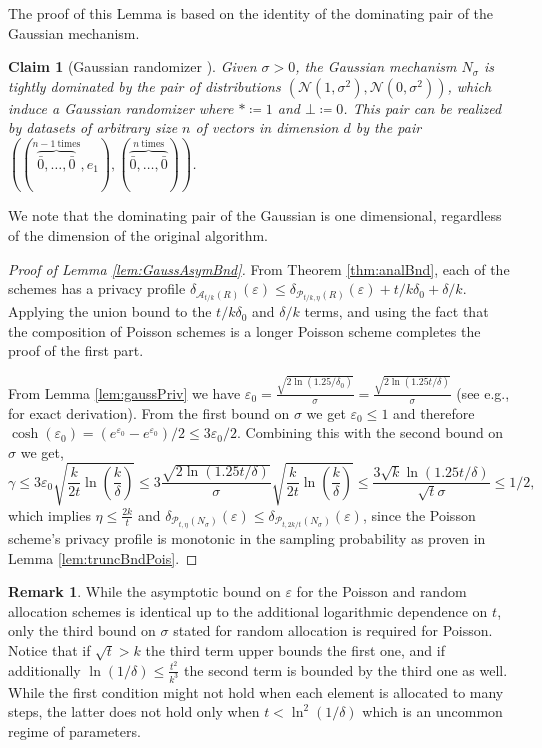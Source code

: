 \documentclass{article}
\newcommand{\mainThmAsym}{thm:analBnd}
\newcommand{\mainThmAsym}{thm:asymBnd}
\theoremstyle{plain}
\newtheorem{claim}[theorem]{Claim}
\theoremstyle{definition}
\newtheorem{remark}[theorem]{Remark}
\newcommand{\eps}{\varepsilon}
\newcommand{\rand}{R}
\newcommand{\Pois}[2]{\mathcal{P}_{#1}\left(#2\right)}
\newcommand{\alloc}[2]{\mathcal{A}_{#1}\left(#2\right)}
\newcommand{\privProf}[1]{\delta_{#1}}
\begin{document}
The proof of this Lemma is based on the identity of the dominating pair of the Gaussian mechanism.
\begin{claim}[Gaussian randomizer \citep{ACGMMT16}] \label{clm:domPairGauss}
    Given $\sigma > 0$, the Gaussian mechanism $N_{\sigma}$ is tightly dominated by the pair of distributions $(\mathcal{N}(1, \sigma^{2}), \mathcal{N}(0, \sigma^{2}))$, which induce a Gaussian randomizer where $* \coloneqq 1$ and $\bot \coloneqq 0$. This pair can be realized by datasets of arbitrary size $n$ of vectors in dimension $d$ by the pair $((\overset{n-1~\text{times}}{\overbrace{\bar{0}, \ldots, \bar{0}}}, e_{1}), (\overset{n~\text{times}}{\overbrace{\bar{0}, \ldots, \bar{0}}}))$.
\end{claim}
We note that the dominating pair of the Gaussian is one dimensional, regardless of the dimension of the original algorithm.

\begin{proof}[Proof of Lemma \ref{lem:GaussAsymBnd}]
    From Theorem \ref{\mainThmAsym}, each of the schemes has a privacy profile $\privProf{\alloc{t/k}{\rand}}(\eps) \le \privProf{\Pois{t/k, \eta}{\rand}}(\eps) + t/k \delta_{0} + \delta/k$. Applying the union bound to the $t/k \delta_{0}$ and $\delta/k$ terms, and using the fact that the composition of Poisson schemes is a longer Poisson scheme completes the proof of the first part.

    From Lemma \ref{lem:gaussPriv} we have $\eps_0 = \frac{\sqrt{2\ln(1.25/ \delta_{0})}}{\sigma} = \frac{\sqrt{2\ln(1.25 t/ \delta)}}{\sigma}$ (see e.g., \citet{DR14} for exact derivation). From the first bound on $\sigma$ we get $\eps_{0} \le 1$ and therefore $\cosh(\eps_0) = (e^{\eps_0}-e^{\eps_0})/2 \leq 3 \eps_0/2$. Combining this with the second bound on $\sigma$ we get,
    \[
        \gamma \le 3 \eps_0 \sqrt{\frac{k}{2t} \ln \left(\frac{k}{\delta} \right)} \le 3 \frac{\sqrt{2\ln(1.25t/\delta)}}{\sigma} \sqrt{\frac{k}{2t} \ln \left(\frac{k}{\delta} \right)} \le \frac{3\sqrt{k} \ln(1.25t/\delta)}{\sqrt{t}\sigma} \le 1/2,
    \]
    which implies $\eta \leq \frac{2k}{t}$ and $\privProf{\Pois{t,\eta}{N_{\sigma}}}(\eps) \le \privProf{\Pois{t, 2 k / t}{N_{\sigma}}}(\eps)$, since the Poisson scheme's privacy profile is monotonic in the sampling probability as proven in Lemma \ref{lem:truncBndPois}.
\end{proof}

\begin{remark} \label{rem:asymComp}
    While the asymptotic bound on $\eps$ for the Poisson and random allocation schemes is identical up to the additional logarithmic dependence on $t$, only the third bound on $\sigma$ stated for random allocation is required for Poisson. Notice that if $\sqrt{t} > k$ the third term upper bounds the first one, and if additionally $\ln(1/\delta) \le \frac{t^{2}}{k^{3}}$ the second term is bounded by the third one as well. While the first condition might not hold when each element is allocated to many steps, the latter does not hold only when $t < \ln^{2}(1 / \delta)$ which is an uncommon regime of parameters.
\end{remark}
\end{document}

